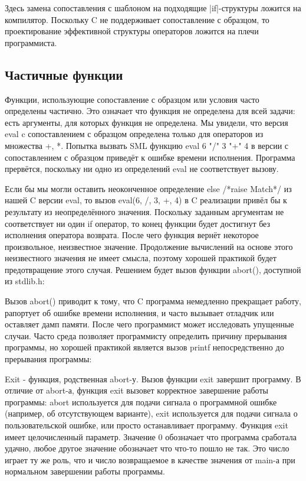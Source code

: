 Здесь замена сопоставления с шаблоном на подходящие \inline|if|-структуры ложится на компилятор. Поскольку C не поддерживает сопоставление с образцом, то проектирование эффективной структуры операторов ложится на плечи программиста.

\subsection{Частичные функции}\label{PartialFunctions}

Функции, использующие сопоставление с образцом или условия часто определены частично. Это означает что функция не определена для всей задачи: есть аргументы, для которых функция не определена. Мы увидели, что версия eval c сопоставлением с образцом определена только для операторов из множества {+, *}. Попытка вызвать SML функцию eval 6 "/" 3 "+" 4 в версии с сопоставлением с образцом приведёт к ошибке времени исполнения. Программа прервётся, поскольку ни одно из определений eval не соответствует вызову.

Если бы мы могли оставить неоконченное определение else /*raise Match*/ из нашей C версии eval, то вызов eval(6, /, 3, +, 4) в C реализации привёл бы к результату из неопределённого значения. Поскольку заданным аргументам не соответствует ни один if оператор, то конец функции будет достигнут без исполнения оператора возврата. После чего функция вернёт некоторое произвольное, неизвестное значение. Продолжение вычислений на основе этого неизвестного значения не имеет смысла, поэтому хорошей практикой будет предотвращение этого случая. Решением будет вызов функции abort(), доступной из stdlib.h:

Вызов abort() приводит к тому, что C программа немедленно прекращает работу, рапортует об ошибке времени исполнения, и часто вызывает отладчик или оставляет дамп памяти. После чего программист может исследовать упущенные случаи. Часто среда позволяет программисту определить причину прерывания программы, но хорошей практикой является вызов printf непосредственно до прерывания программы:

Exit - функция, родственная abort-у. Вызов функции exit завершит программу. В отличие от abort-а, функция exit вызовет корректное завершение работы программы: abort используется для подачи сигнала о программной ошибке (например, об отсутствующем варианте), exit используется для подачи сигнала о пользовательской ошибке, или просто останавливает программу. Функция exit имеет целочисленный параметр. Значение 0 обозначает что программа сработала удачно, любое другое значение обозначает что что-то пошло не так. Это число играет ту же роль, что и число возвращаемое в качестве значения от main-а при нормальном завершении работы программы.

